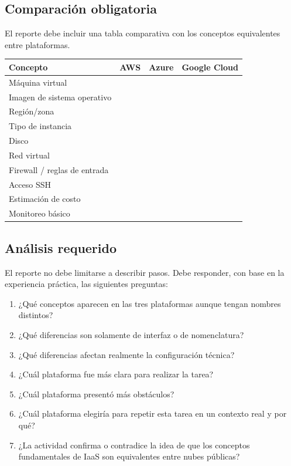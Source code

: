 \documentclass[
  coursetitle={Cómputo Nube y Tecnologías Emergentes},
  coursehours={96},
  coursedate={Verano 2026},
  doctype={Tarea 1},
  otherlangs={english,french},
  authorname={Lázaro},
  authorsurname={Bustio-Martínez},
  authortitle={PhD},
  role={Profesor Investigador},
  email={lbustio@inaoe.mx},
  phone={5559504000},
  ext={7459},
  institution={Instituto Nacional de Astrofísica, Óptica y Electrónica (INAOE)},
  department={Maestría en Ciencias en Tecnologías de Seguridad},
  address={Luis Enrique Erro 1, Sta. Ma. Tonantzintla, San Andrés Cholula, CP 72840, Puebla, México},
  margin={0.5in}
]{../../../lbustio_lecture_notes}
\begin{document}
\subsection{Comparación obligatoria}
\label{sec:tarea1-comparacion}

El reporte debe incluir una tabla comparativa con los conceptos equivalentes entre plataformas.

\begin{center}
\begin{tabular}{|p{}|p{}|p{}|p{}|}
\hline
\textbf{Concepto} & \textbf{AWS} & \textbf{Azure} & \textbf{Google Cloud} \\
\hline
Máquina virtual & & & \\
\hline
Imagen de sistema operativo & & & \\
\hline
Región/zona & & & \\
\hline
Tipo de instancia & & & \\
\hline
Disco & & & \\
\hline
Red virtual & & & \\
\hline
Firewall / reglas de entrada & & & \\
\hline
Acceso SSH & & & \\
\hline
Estimación de costo & & & \\
\hline
Monitoreo básico & & & \\
\hline
\end{tabular}
\end{center}

\subsection{Análisis requerido}
\label{sec:tarea1-analisis}

El reporte no debe limitarse a describir pasos. Debe responder, con base en la experiencia práctica, las siguientes preguntas:

\begin{enumerate}
  \item ¿Qué conceptos aparecen en las tres plataformas aunque tengan nombres distintos?
  \item ¿Qué diferencias son solamente de interfaz o de nomenclatura?
  \item ¿Qué diferencias afectan realmente la configuración técnica?
  \item ¿Cuál plataforma fue más clara para realizar la tarea?
  \item ¿Cuál plataforma presentó más obstáculos?
  \item ¿Cuál plataforma elegiría para repetir esta tarea en un contexto real y por qué?
  \item ¿La actividad confirma o contradice la idea de que los conceptos fundamentales de IaaS son equivalentes entre nubes públicas?
\end{enumerate}
\end{document}
